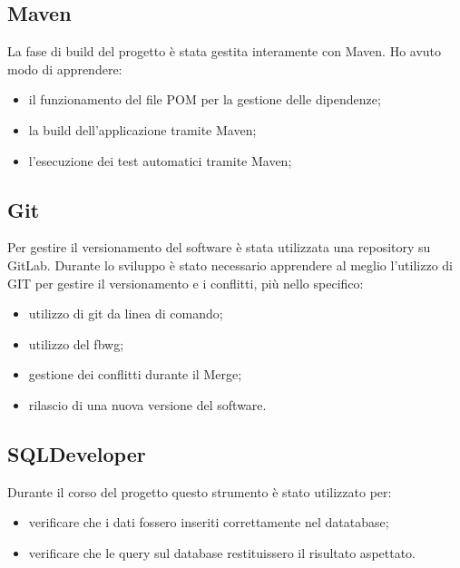 \subsection{Maven}
La fase di build del progetto è stata gestita interamente con Maven.
Ho avuto modo di apprendere:
\begin{itemize}
    \item il funzionamento del file POM per la gestione delle dipendenze;
    \item la build dell'applicazione tramite Maven;
    \item l'esecuzione dei test automatici tramite Maven;
\end{itemize}

\subsection{Git}
Per gestire il versionamento del software è stata utilizzata una repository su GitLab. Durante lo sviluppo è stato necessario apprendere al meglio l'utilizzo di GIT per gestire il versionamento e i conflitti, più nello specifico:
\begin{itemize}
    \item utilizzo di git da linea di comando;
    \item utilizzo del \gls{fbwg}\glsfirstoccur{};
    \item gestione dei conflitti durante il Merge;
    \item rilascio di una nuova versione del software.
\end{itemize}

\subsection{SQLDeveloper}
Durante il corso del progetto questo strumento è stato utilizzato per:
\begin{itemize}
    \item verificare che i dati fossero inseriti correttamente nel datatabase;
    \item verificare che le query sul database restituissero il risultato aspettato.
\end{itemize}

